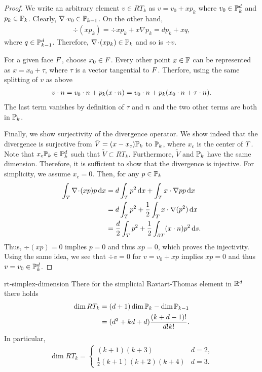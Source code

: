 \begin{proof}
  We write an arbitrary element $v\in RT_k$ as $v=v_0+x p_k$ where
  $v_0\in \P_k^d$ and $p_k\in \P_k$. Clearly, $\div v_0 \in
  \P_{k-1}$. On the other hand,
  \begin{gather*}
    \div (xp_k) = \div x p_k + x\nabla p_k = d p_k + x q,
  \end{gather*}
  where $q\in \P_{k-1}^d$. Therefore, $\div(xp_k) \in \P_k$ and so is
  $\div v$.

  For a given face $\face$, choose $x_0\in\face$. Every other point
  $x\in \F$ can be represented as $x=x_0+ \tau$, where $\tau$ is a
  vector tangential to $\face$. Therfore, using the same splitting of
  $v$ as above
  \begin{gather*}
    v\cdot\n = v_0\cdot\n + p_k (x\cdot\n)
    = v_0\cdot\n + p_k (x_0\cdot\n + \tau\cdot\n).
  \end{gather*}
  The last term vanishes by definition of $\tau$ and $\n$ and the two
  other terms are both in $\P_k$.

  Finally, we show surjectivity of the divergence operator. We show
  indeed that the divergence is surjective from
  $\tilde V = (x-x_c)\P_k$ to $\P_k$, where $x_c$ is the center of
  $\cell$. Note that $x_c\P_k\in \P_k^d$ such that
  $\tilde V\subset RT_k$. Furthermore, $\tilde V$ and $\P_k$ have the
  same dimension. Therefore, it is sufficient to show that the
  divergence is injective. For simplicity, we assume $x_c=0$. Then,
  for any $p\in \P_k$
  \begin{align*}
    \int_\cell \div (xp)p \dx
    &= d \int_\cell p^2\dx + \int_\cell x \cdot\nabla p p\dx
    \\
    &= d \int_\cell p^2 + \frac12 \int_\cell x \cdot\nabla(p^2)\dx
    \\
    &= \frac d2 \int_\cell p^2 + \frac12 \int_{\d\cell} (x\cdot\n) p^2\ds.
  \end{align*}
  Thus, $\div(xp) = 0$ implies $p=0$ and thus $xp=0$, which proves the
  injectivity. Using the same idea, we see that $\div v=0$ for
  $v=v_0+xp$ implies $xp=0$ and thus $v=v_0\in\P_k^d$.
\end{proof}

\begin{Lemma}{rt-simplex-dimension}
  There for the simplicial Raviart-Thomas element in $\R^d$ there
  holds
  \begin{gather}
    \label{eq:darcy:25}
    \begin{split}
      \dim RT_k &= (d+1)\dim\P_k - \dim \P_{k-1}
      \\
      &= (d^2+kd+d)\frac{(k+d-1)!}{d!k!}.      
    \end{split}
  \end{gather}
  In particular,
  \begin{gather}
    \label{eq:darcy:23}
    \dim RT_k =
    \begin{cases}
      (k+1)(k+3) & d=2,
      \\
      \tfrac12 (k+1)(k+2)(k+4) & d=3.
    \end{cases}
  \end{gather}
\end{Lemma}

